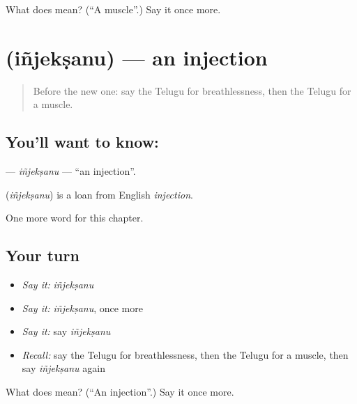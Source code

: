 \begin{tcolorbox}[breakable,colback=teal!4,colframe=teal!35!black,title={Before you move on}]
What does  mean? (\textquotedblleft{}A muscle\textquotedblright{}.) Say it once more.
\end{tcolorbox}
\section[\texorpdfstring{\te{ఇంజెక్షను} (iñjekṣanu)}{ఇంజెక్షను (iñjekṣanu)}]{ (iñjekṣanu) — an injection}

\label{lesson:TE-C251-injeksanu}



\begin{quote}
Before the new one: say the Telugu for breathlessness, then the Telugu for a muscle.
\end{quote}

\subsection*{You'll want to know: }
\textbf{} — \emph{iñjekṣanu} — \textquotedblleft{}an injection\textquotedblright{}.

\begin{cousinweb}
\textbf{} (\emph{iñjekṣanu}) is a loan from English \emph{injection}.
\end{cousinweb}

\begin{grammarlens}[title={What you've built}]
One more word for this chapter.
\end{grammarlens}

\subsection*{Your turn}
\begin{itemize}
\raggedright
  \item \emph{Say it:} \emph{iñjekṣanu}
  \item \emph{Say it:} \emph{iñjekṣanu}, once more
  \item \emph{Say it:} say \emph{iñjekṣanu}
  \item \emph{Recall:} say the Telugu for breathlessness, then the Telugu for a muscle, then say \emph{iñjekṣanu} again
\end{itemize}

\begin{tcolorbox}[breakable,colback=teal!4,colframe=teal!35!black,title={Before you move on}]
What does  mean? (\textquotedblleft{}An injection\textquotedblright{}.) Say it once more.
\end{tcolorbox}

